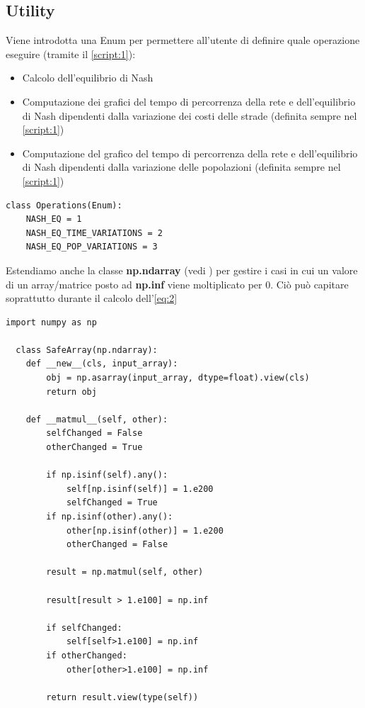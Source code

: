 \subsection{Utility}
\label{subsec:Utility}

Viene introdotta una Enum per permettere all'utente di definire quale operazione eseguire (tramite il \autoref{script:1}):
\begin{itemize}
    \item Calcolo dell'equilibrio di Nash
    \item Computazione dei grafici del tempo di percorrenza della rete e dell'equilibrio di Nash dipendenti dalla variazione dei costi delle strade (definita sempre nel \autoref{script:1})
    \item Computazione del grafico del tempo di percorrenza della rete e dell'equilibrio di Nash dipendenti dalla variazione delle popolazioni (definita sempre nel \autoref{script:1})
\end{itemize}
\begin{lstlisting}[style=myStile, caption={Operations}, label={script:2}]
  class Operations(Enum):
    NASH_EQ = 1
    NASH_EQ_TIME_VARIATIONS = 2
    NASH_EQ_POP_VARIATIONS = 3
\end{lstlisting}

Estendiamo anche la classe \textbf{np.ndarray} (vedi \cite{numpy_docs}) per gestire i casi in cui un valore di un array/matrice posto ad \textbf{np.inf} viene moltiplicato per 0.
Ciò può capitare soprattutto durante il calcolo dell'\autoref{eq:2}

\begin{lstlisting}[style=myStile, caption={SafeArray}, label={script:3}]
  import numpy as np

  class SafeArray(np.ndarray):
    def __new__(cls, input_array):
        obj = np.asarray(input_array, dtype=float).view(cls)
        return obj
    
    def __matmul__(self, other):
        selfChanged = False
        otherChanged = True        
        
        if np.isinf(self).any():
            self[np.isinf(self)] = 1.e200
            selfChanged = True
        if np.isinf(other).any():
            other[np.isinf(other)] = 1.e200
            otherChanged = False
            
        result = np.matmul(self, other)
        
        result[result > 1.e100] = np.inf
        
        if selfChanged:
            self[self>1.e100] = np.inf
        if otherChanged:
            other[other>1.e100] = np.inf

        return result.view(type(self))
\end{lstlisting}


